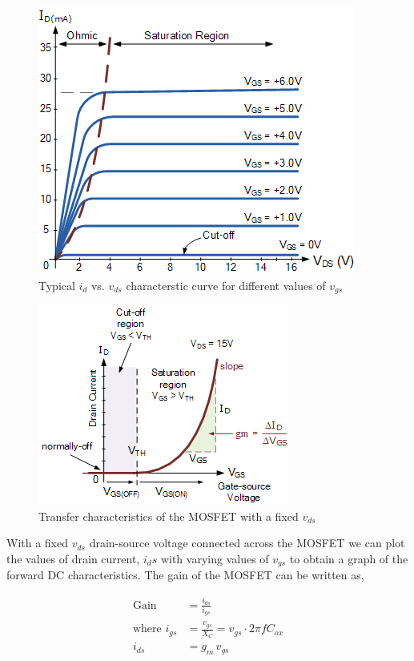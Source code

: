 \begin{figure}[H]
    \centering
    \includegraphics[width=0.65\columnwidth]{images/drain.png}
    \caption{Typical $i_d$ vs. $v_{ds}$ characterstic curve for different values of $v_{gs}$}
    \label{drain}
\end{figure}

\begin{figure}[H]
    \centering
    \includegraphics[width=0.65\columnwidth]{images/trans.png}
    \caption{Transfer characteristics of the MOSFET with a fixed $v_{ds}$}
    \label{trans}
\end{figure}

With a fixed $v_{ds}$ drain-source voltage connected across the MOSFET we can plot the values of drain current, $i_ds$ with varying values of $v_{gs}$ to obtain a graph of the forward DC characteristics. The gain of the MOSFET can be written as,

\begin{align*}
    \text{Gain } &= \frac{i_{ds}}{i_{gs}}\\
    \text{where } i_{gs} &= \frac{v_{gs}}{X_C} = v_{gs}\cdot 2\pi f C_{ox}\\
    i_{ds} &= g_m\,v_{gs}
\end{align*}

